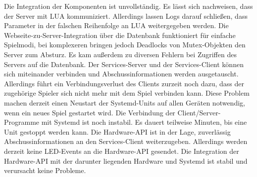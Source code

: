 Die Integration der Komponenten ist unvollständig.
Es lässt sich nachweisen, dass der Server mit LUA kommuniziert.
Allerdings lassen Logs darauf schließen, dass Parameter in der falschen Reihenfolge an LUA
weitergegeben werden.
Die Webseite-zu-Server-Integration über die Datenbank funktioniert für einfache Spielmodi, bei
komplexeren bringen jedoch Deadlocks von Mutex-Objekten den Server zum Absturz.
Es kam außerdem zu diversen Fehlern bei Zugriffen des Servers auf die Datenbank.
Der Services-Server und der Services-Client können sich miteinander verbinden und
Abschussinformationen werden ausgetauscht.
Allerdings führt ein Verbindungsverlust des Clients zurzeit noch dazu, dass der zugehörige Spieler
sich nicht mehr mit dem Spiel verbinden kann.
Diese Problem machen derzeit einen Neustart der Systemd-Units auf allen Geräten notwendig, wenn ein
neues Spiel gestartet wird.
Die Verbindung der Client/Server-Programme mit Systemd ist noch instabil.
Es dauert teilweise Minuten, bis eine Unit gestoppt werden kann.
Die Hardware-API ist in der Lage, zuverlässig Abschussinformationen an den Services-Client
weiterzugeben.
Allerdings werden derzeit keine LED-Events an die Hardware-API gesendet.
Die Integration der Hardware-API mit der darunter liegenden Hardware und Systemd ist stabil und
verursacht keine Probleme.

